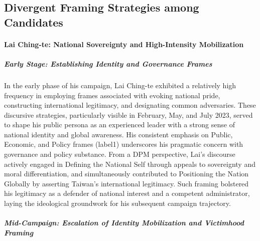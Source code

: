 \documentclass[man,12pt]{apa7}
\begin{document}
\subsection{Divergent Framing Strategies among Candidates}
\paragraph{Lai Ching-te: National Sovereignty and High-Intensity Mobilization}


\subparagraph{Early Stage: Establishing Identity and Governance Frames}

In the early phase of his campaign, Lai Ching-te exhibited a relatively high frequency in employing frames associated with evoking national pride, constructing international legitimacy, and designating common adversaries. These discursive strategies, particularly visible in February, May, and July 2023, served to shape his public persona as an experienced leader with a strong sense of national identity and global awareness. His consistent emphasis on Public, Economic, and Policy frames (label1) underscores his pragmatic concern with governance and policy substance. From a DPM perspective, Lai's discourse actively engaged in Defining the National Self through appeals to sovereignty and moral differentiation, and simultaneously contributed to Positioning the Nation Globally by asserting Taiwan's international legitimacy. Such framing bolstered his legitimacy as a defender of national interest and a competent administrator, laying the ideological groundwork for his subsequent campaign trajectory.

\subparagraph{Mid-Campaign: Escalation of Identity Mobilization and Victimhood Framing}
\end{document}
